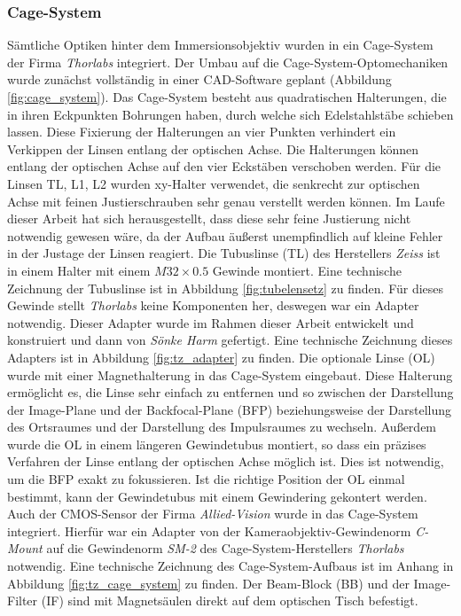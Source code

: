 \documentclass[a4paper, titlepage,  ngerman, fullpage]{book}
\begin{document}
	\subsubsection{Cage-System}
	Sämtliche Optiken hinter dem Immersionsobjektiv wurden in ein Cage-System der Firma \textit{Thorlabs} integriert. Der Umbau auf die Cage-System-Optomechaniken wurde zunächst vollständig in einer CAD-Software geplant (Abbildung \ref{fig:cage_system}). Das Cage-System besteht aus quadratischen Halterungen, die in ihren Eckpunkten Bohrungen haben, durch welche sich Edelstahlstäbe schieben lassen. Diese Fixierung der Halterungen an vier Punkten verhindert ein Verkippen der Linsen entlang der optischen Achse. Die Halterungen können entlang der optischen Achse auf den vier Eckstäben verschoben werden. Für die  Linsen TL, L1, L2 wurden xy-Halter verwendet, die senkrecht zur optischen Achse mit feinen Justierschrauben sehr genau verstellt werden können. Im Laufe dieser Arbeit hat sich herausgestellt, dass diese sehr feine Justierung nicht notwendig gewesen wäre, da der Aufbau äußerst unempfindlich auf kleine Fehler in der Justage der Linsen reagiert. Die Tubuslinse (TL) des Herstellers \textit{Zeiss} ist in einem Halter mit einem $M32\times0.5$ Gewinde montiert. Eine technische Zeichnung der Tubuslinse ist in Abbildung \ref{fig:tubelensetz} zu finden. Für dieses Gewinde stellt \textit{Thorlabs} keine Komponenten her, deswegen war ein Adapter notwendig. Dieser Adapter wurde im Rahmen dieser Arbeit entwickelt und konstruiert und dann von \textit{Sönke Harm} gefertigt. Eine technische Zeichnung dieses Adapters ist in Abbildung \ref{fig:tz_adapter} zu finden. Die optionale Linse (OL) wurde mit einer Magnethalterung in das Cage-System eingebaut. Diese Halterung ermöglicht es, die Linse sehr einfach zu entfernen und so zwischen der Darstellung der Image-Plane und der Backfocal-Plane (BFP) beziehungsweise der Darstellung des Ortsraumes und der Darstellung des Impulsraumes zu wechseln. Außerdem wurde die OL in einem längeren Gewindetubus montiert, so dass ein präzises Verfahren der Linse entlang der optischen Achse möglich ist. Dies ist notwendig, um die BFP exakt zu fokussieren. Ist die richtige Position der OL einmal bestimmt, kann der Gewindetubus mit einem Gewindering gekontert werden. Auch der CMOS-Sensor der Firma \textit{Allied-Vision} wurde in das Cage-System integriert. Hierfür war ein Adapter von der Kameraobjektiv-Gewindenorm \textit{C-Mount} auf die Gewindenorm \textit{SM-2} des Cage-System-Herstellers \textit{Thorlabs} notwendig. Eine technische Zeichnung des Cage-System-Aufbaus ist im Anhang in Abbildung \ref{fig:tz_cage_system} zu finden. Der Beam-Block (BB) und der Image-Filter (IF) sind mit Magnetsäulen direkt auf dem optischen Tisch befestigt.
\end{document}
